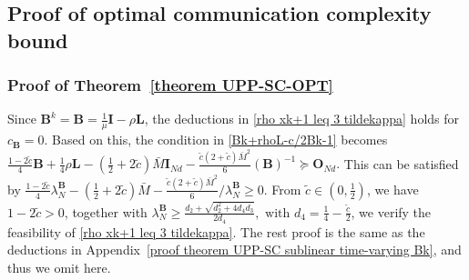 \documentclass[12pt,draftcls,onecolumn]{IEEEtran}
\newcommand{\bB}{{\mathbf{B}}}
\newcommand{\bL}{{\mathbf{L}}}
\newcommand{\bI}{{\mathbf{I}}}
\begin{document}
\subsection{Proof of optimal communication complexity bound}\label{optimal convergence}
\subsubsection{Proof of Theorem~\ref{theorem UPP-SC-OPT}}\label{proof theorem UPP-SC-OPT}
Since $\bB^k=\bB=\frac{1}{\mu}\bI-\rho\bL$, the deductions in \eqref{rho xk+1 leq 3 tildekappa} holds for $c_{\bB}=0$. Based on this, the condition in \eqref{Bk+rhoL-c/2Bk-1} becomes $\frac{1-2\tilde{c}}{4}\mathbf{B}+\frac{1}{4}\rho \mathbf{L}-(\frac{1}{2}+2\tilde{c})\bar{M}\mathbf{I}_{Nd}-\frac{\tilde{c}(2+\tilde{c})\bar{M}^2}{6}(\mathbf{B})^{-1} \succeq \mathbf{O}_{Nd}.$
This can be satisfied by $\frac{1-2\tilde{c}}{4}\lambda_N^\bB-(\frac{1}{2}+2\tilde{c})\bar{M}-\frac{\tilde{c}(2+\tilde{c})\bar{M}^2}{6}/\lambda_N^\bB \geq 0.$
From $\tilde{c}\in(0,\frac{1}{2})$, we have $1-2\tilde{c}>0$, together with $\lambda_N^{\mathbf{B}}\geq \frac{d_2+\sqrt{d_2^2+4d_4d_3}}{2d_4} , \text{ with } d_4= \frac{1}{4}- \frac{\tilde{c}}{2}$, we verify the feasibility of \eqref{rho xk+1 leq 3 tildekappa}. The rest proof is the same as the deductions in Appendix~\ref{proof theorem UPP-SC sublinear time-varying Bk}, and thus we omit here.
\end{document}
